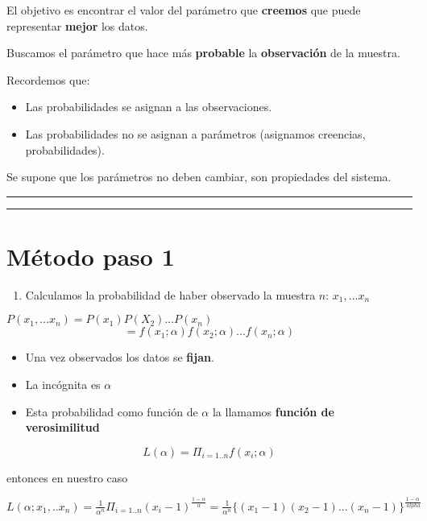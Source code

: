 \documentclass[
]{book}
\providecommand{\tightlist}{%
  \setlength{\itemsep}{0pt}\setlength{\parskip}{0pt}}
\begin{document}
El objetivo es encontrar el valor del parámetro que \textbf{creemos} que puede representar \textbf{mejor} los datos.

Buscamos el parámetro que hace más \textbf{probable} la \textbf{observación} de la muestra.

Recordemos que:

\begin{itemize}
\tightlist
\item
  Las probabilidades se asignan a las observaciones.
\item
  Las probabilidades no se asignan a parámetros (asignamos creencias, probabilidades).
\end{itemize}

Se supone que los parámetros no deben cambiar, son propiedades del sistema.

\begin{center}\rule{0.5\linewidth}{0.5pt}\end{center}

\begin{center}\rule{0.5\linewidth}{0.5pt}\end{center}

\hypertarget{muxe9todo-paso-1}{%
\section{Método paso 1}\label{muxe9todo-paso-1}}

\begin{enumerate}
\def\labelenumi{\arabic{enumi}.}
\tightlist
\item
  Calculamos la probabilidad de haber observado la muestra \(n\): \(x_1,...x_n\)
\end{enumerate}

\(P(x_1,...x_n)=P(x_1)P(X_2)...P(x_n)\)
\[=f(x_1;\alpha)f(x_2;\alpha) ...f(x_n;\alpha)\]

\begin{itemize}
\tightlist
\item
  Una vez observados los datos se \textbf{fijan}.
\item
  La incógnita es \(\alpha\)
\item
  Esta probabilidad como función de \(\alpha\) la llamamos \textbf{función de verosimilitud}
\end{itemize}

\[L(\alpha)= \Pi_{i=1..n} f(x_i; \alpha)\]

entonces en nuestro caso

\(L(\alpha;x_1,..x_n)= \frac{1}{\alpha^n} \Pi_{i=1..n} (x_i-1)^{\frac{1-\alpha}{ \alpha}}= \frac{1}{\alpha^n} \{(x_1-1)(x_2-1)...(x_n-1)\}^{\frac{1-\alpha}{\ alpha}}\)
\end{document}
